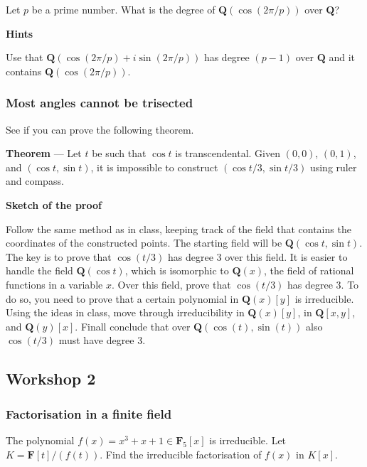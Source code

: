 \documentclass[11pt]{article}
\begin{document}
\noindent
Let \(p\) be a prime number.
What is the degree of \(\mathbf{Q}(\cos (2\pi/p))\) over \(\mathbf{Q}\)?

\bigskip

\noindent
\textbf{\textbf{Hints}}

Use that \(\mathbf{Q}(\cos(2\pi/p) + i \sin(2\pi/p))\) has degree \((p-1)\) over \(\mathbf{Q}\) and it contains \(\mathbf{Q}(\cos(2\pi/p))\).
\subsubsection{Most angles cannot be trisected}
\label{sec:orgb12522c}

See if you can prove the following theorem.

\bigskip

\noindent
\textbf{\textbf{Theorem}} ---
Let \(t\) be such that \(\cos t\) is transcendental.
Given \((0,0)\), \((0,1)\), and \((\cos t, \sin t)\), it is impossible to construct \((\cos t/3, \sin t/3)\) using ruler and compass.

\bigskip

\noindent
\textbf{\textbf{Sketch of the proof}}

Follow the same method as in class, keeping track of the field that contains the coordinates of the constructed points.
The starting field will be \(\mathbf{Q}(\cos t, \sin t)\).
The key is to prove that \(\cos (t/3)\) has degree 3 over this field.
It is easier to handle the field \(\mathbf{Q}(\cos t)\), which is isomorphic to \(\mathbf{Q}(x)\), the field of rational functions in a variable \(x\).
Over this field, prove that \(\cos(t/3)\) has degree 3.
To do so, you need to prove that a certain polynomial in \(\mathbf{Q}(x)[y]\) is irreducible.
Using the ideas in class, move through irreducibility in \(\mathbf{Q}(x)[y]\), in \(\mathbf{Q}[x,y]\), and \(\mathbf{Q}(y)[x]\).
Finall conclude that over \(\mathbf{Q}(\cos(t), \sin(t))\) also \(\cos(t/3)\) must have degree 3.
\subsection{Workshop 2}
\label{sec:org6a31fbf}
\subsubsection{Factorisation in a finite field}
\label{sec:orgee603b2}

The polynomial \(f(x) = x^3+x+1 \in \mathbf{F}_5[x]\) is irreducible.
Let \(K = \mathbf{F}[t]/(f(t))\).
Find the irreducible factorisation of \(f(x)\) in \(K[x]\).
\end{document}
